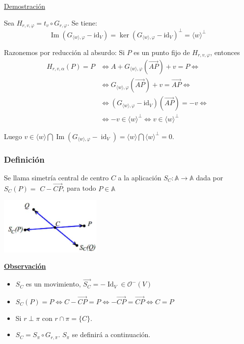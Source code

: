 \documentclass[12pt, a4paper, ones, notitlepage, openany,titlepage]{article}
\newcommand{\demostracion}{\noindent\underline{Demostración}}
\newcommand{\observacion}{\noindent\underline{\textbf{Observación}}}
\newcommand{\identidad}{\operatorname{Id}}
\begin{document}
\demostracion

\noindent Sea $H_{r, v, \varphi}=t_{v} \circ G_{r, \varphi}$. Se tiene:
$$
\operatorname{Im}\left(G_{\langle w\rangle, \varphi}-\mathrm{id}_{V}\right)=\ker\left(G_{\langle w\rangle, \varphi}-\mathrm{id}_{V}\right)^{\perp}=\langle w\rangle^{\perp}
$$

\noindent Razonemos por reducción al absurdo: Si $P$ es un punto fijo de $H_{r, v, \varphi}$, entonces
$$
\begin{aligned}
H_{r, v, \alpha}(P)=P & \Longleftrightarrow A+G_{\langle w\rangle, \varphi}(\overrightarrow{A P})+v=P \Longleftrightarrow \\
& \Longleftrightarrow G_{\langle w\rangle, \varphi}(\overrightarrow{A P})+v=\overrightarrow{A P} \Longleftrightarrow \\
& \Longleftrightarrow \left(G_{\langle w\rangle, \varphi}-\mathrm{id}_{V}\right)(\overrightarrow{A P})=-v \Longleftrightarrow \\
& \Longleftrightarrow -v \in \langle w \rangle^\perp \Longleftrightarrow v \in \langle w \rangle^\perp
\end{aligned}
$$

\noindent Luego $v \in\langle w\rangle \bigcap \operatorname{Im}\left(G_{\langle w\rangle, \varphi}-\operatorname{id}_{V}\right)=\langle w\rangle \bigcap\langle w\rangle^{\perp}=0$.

\subsubsection{Definición}
Se llama simetría central de centro $C$ a la aplicación $S_{C}: \mathbb{A} \rightarrow \mathbb{A}$ dada por $S_{C}(P)=$ $C-\overrightarrow{C P}$, para todo $P \in \mathbb{A}$

\begin{center}
	\includegraphics[max width=5cm]{2023_05_02_d6703e6c81ebe4fb6eaag-084(1)}
\end{center}

\observacion

\begin{itemize}
	\item $S_C$ es un movimiento, $\overrightarrow{S_C} = -\identidad_V \in \mathcal{O}^-(V)$
	\item $S_C(P) = P \Longleftrightarrow C - \overrightarrow{CP} = P \Longleftrightarrow - \overrightarrow{CP} = \overrightarrow{CP} \Longleftrightarrow C = P$
	\item Si $r \perp \pi$ con $r \cap \pi = \{C\}$.
	\item $S_C = S_\pi \circ G_{r,\pi}$. $S_\pi$ se definirá a continuación.
\end{itemize}
\end{document}
